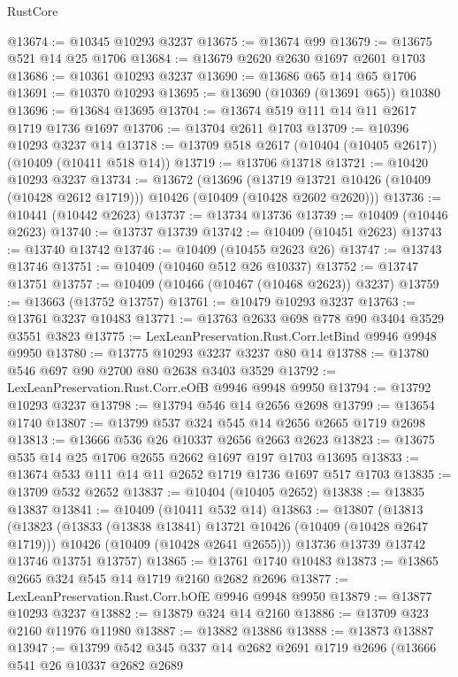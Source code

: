 \begin{lexlean}{RustCore}
\begin{coremodule}
@13674 := @10345 @10293 @3237
@13675 := @13674 @99
@13679 := @13675 @521 @14 @25 @1706
@13684 := @13679 @2620 @2630 @1697 @2601 @1703
@13686 := @10361 @10293 @3237
@13690 := @13686 @65 @14 @65 @1706
@13691 := @10370 @10293
@13695 := @13690 (@10369 (@13691 @65)) @10380
@13696 := @13684 @13695
@13704 := @13674 @519 @111 @14 @11 @2617 @1719 @1736 @1697
@13706 := @13704 @2611 @1703
@13709 := @10396 @10293 @3237 @14
@13718 := @13709 @518 @2617 (@10404 (@10405 @2617)) (@10409 (@10411 @518 @14))
@13719 := @13706 @13718
@13721 := @10420 @10293 @3237
@13734 := @13672
    (@13696
      (@13719 @13721 @10426 (@10409 (@10428 @2612 @1719)))
      @10426
      (@10409 (@10428 @2602 @2620)))
@13736 := @10441 (@10442 @2623)
@13737 := @13734 @13736
@13739 := @10409 (@10446 @2623)
@13740 := @13737 @13739
@13742 := @10409 (@10451 @2623)
@13743 := @13740 @13742
@13746 := @10409 (@10455 @2623 @26)
@13747 := @13743 @13746
@13751 := @10409 (@10460 @512 @26 @10337)
@13752 := @13747 @13751
@13757 := @10409 (@10466 (@10467 (@10468 @2623)) @3237)
@13759 := @13663 (@13752 @13757)
@13761 := @10479 @10293 @3237
@13763 := @13761 @3237 @10483
@13771 := @13763 @2633 @698 @778 @90 @3404 @3529 @3551 @3823
@13775 := LexLeanPreservation.Rust.Corr.letBind @9946 @9948 @9950
@13780 := @13775 @10293 @3237 @3237 @80 @14
@13788 := @13780 @546 @697 @90 @2700 @80 @2638 @3403 @3529
@13792 := LexLeanPreservation.Rust.Corr.eOfB @9946 @9948 @9950
@13794 := @13792 @10293 @3237
@13798 := @13794 @546 @14 @2656 @2698
@13799 := @13654 @1740
@13807 := @13799 @537 @324 @545 @14 @2656 @2665 @1719 @2698
@13813 := @13666 @536 @26 @10337 @2656 @2663 @2623
@13823 := @13675 @535 @14 @25 @1706 @2655 @2662 @1697 @197 @1703 @13695
@13833 := @13674 @533 @111 @14 @11 @2652 @1719 @1736 @1697 @517 @1703
@13835 := @13709 @532 @2652
@13837 := @10404 (@10405 @2652)
@13838 := @13835 @13837
@13841 := @10409 (@10411 @532 @14)
@13863 := @13807
    (@13813
      (@13823
        (@13833 (@13838 @13841) @13721 @10426 (@10409 (@10428 @2647 @1719)))
        @10426
        (@10409 (@10428 @2641 @2655)))
      @13736
      @13739
      @13742
      @13746
      @13751
      @13757)
@13865 := @13761 @1740 @10483
@13873 := @13865 @2665 @324 @545 @14 @1719 @2160 @2682 @2696
@13877 := LexLeanPreservation.Rust.Corr.bOfE @9946 @9948 @9950
@13879 := @13877 @10293 @3237
@13882 := @13879 @324 @14 @2160
@13886 := @13709 @323 @2160 @11976 @11980
@13887 := @13882 @13886
@13888 := @13873 @13887
@13947 := @13799
    @542
    @345
    @337
    @14
    @2682
    @2691
    @1719
    @2696
    (@13666
      @541
      @26
      @10337
      @2682
      @2689

\end{coremodule}
\end{lexlean}
